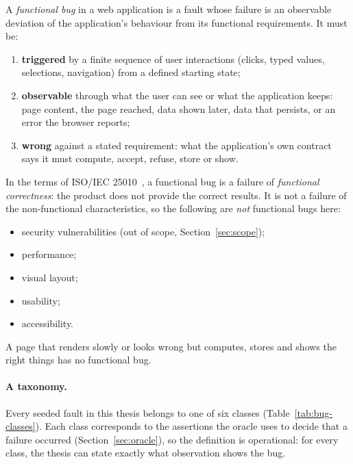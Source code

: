 \begin{Definition}
A \emph{functional bug} in a web application is a fault whose failure is an observable
deviation of the application's behaviour from its functional requirements. It must be:
\begin{enumerate}[noitemsep]
  \item \textbf{triggered} by a finite sequence of user interactions (clicks, typed values,
        selections, navigation) from a defined starting state;
  \item \textbf{observable} through what the user can see or what the application keeps:
        page content, the page reached, data shown later, data that persists, or an
        error the browser reports;
  \item \textbf{wrong} against a stated requirement: what the application's own contract
        says it must compute, accept, refuse, store or show.
\end{enumerate}
\end{Definition}

In the terms of ISO/IEC 25010~\cite{iso25010}, a functional bug is a failure of
\emph{functional correctness}: the product does not provide the correct results. It is not a
failure of the non-functional characteristics, so the following are \emph{not} functional
bugs here:
\begin{itemize}[noitemsep]
  \item security vulnerabilities (out of scope, Section~\ref{sec:scope});
  \item performance;
  \item visual layout;
  \item usability;
  \item accessibility.
\end{itemize}
A page that renders slowly or looks wrong but computes, stores and shows the right things
has no functional bug.

\paragraph{A taxonomy.} Every seeded fault in this thesis belongs to one of six classes
(Table~\ref{tab:bug-classes}). Each class corresponds to the assertions the oracle uses to
decide that a failure occurred (Section~\ref{sec:oracle}), so the definition is operational:
for every class, the thesis can state exactly what observation shows the bug.

